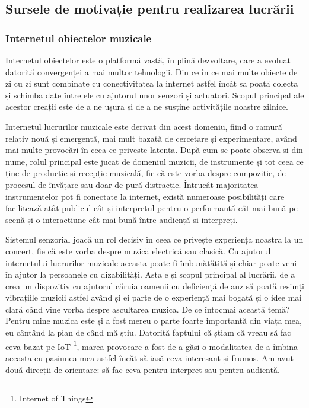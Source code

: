 \documentclass[../IoMusT.tex]{subfiles}
\begin{document}
\subsection{Sursele de motivație pentru realizarea lucrării}
\subsubsection{Internetul obiectelor muzicale}
Internetul obiectelor este o platformă vastă,  în plină dezvoltare, care a evoluat datorită convergenței a mai multor tehnologii. Din ce în ce mai multe obiecte de zi cu zi sunt combinate cu conectivitatea la internet astfel încât să poată colecta și schimba date între ele cu ajutorul unor senzori și actuatori. Scopul principal ale acestor creații este de a ne ușura și de a ne susține activitățile noastre zilnice.
\\
\par Internetul lucrurilor muzicale este derivat din acest domeniu, fiind o ramură relativ nouă și emergentă, mai mult bazată de cercetare și experimentare, având mai multe provocări în ceea ce privește latența. După cum se poate observa și din nume, rolul principal este jucat de domeniul muzicii, de instrumente și tot ceea ce ține de producție și recepție muzicală, fie că este vorba despre compoziție, de procesul de învățare sau doar de pură dis\-trac\-ți\-e. Întrucât majoritatea instrumentelor pot fi conectate la internet, există numeroase posibilități care facilitează atât publicul cât și interpretul pentru o performanță cât mai bună pe scenă și o interacțiune cât mai bună între audiență și interpreți.\cite{IoMusT}
\\
\par Sistemul senzorial joacă un rol decisiv în ceea ce privește experiența noastră la un concert, fie că este vorba despre muzică electrică sau clasică. Cu ajutorul internetului lucrurilor muzicale aceasta poate fi îmbunătățită și chiar poate veni în ajutor la persoanele cu dizabilități. Asta e și scopul principal al lucrării, de a crea un dispozitiv cu ajutorul căruia oamenii cu deficiență de auz să poată resimți vibrațiile muzicii astfel având și ei parte de o experiență mai bogată și o idee mai clară când vine vorba despre ascultarea muzica. De ce întocmai această temă? Pentru mine mu\-zi\-ca este și a fost mereu o parte foarte importantă din viața mea, eu cântând la pian de când mă știu. Datorită faptului că știam că vreau să fac ceva bazat pe IoT \footnote{Internet of Things}, marea provocare a fost de a găsi o modalitatea de a îmbina aceasta cu pasiunea mea astfel încăt să iasă ceva interesant și frumos. Am avut două direcții de orientare: să fac ceva pentru interpret sau pentru audiență.
\end{document}
